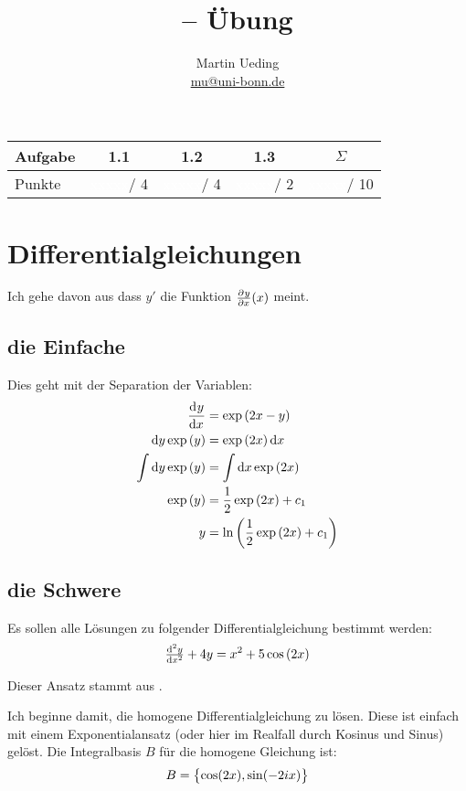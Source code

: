 \documentclass[11pt, ngerman]{article}
\title{\themodul{} -- Übung \theuebung \\ \vspace{0.5cm} \large{\thegruppe}}
\author{Martin Ueding \\ \small{\href{mailto:mu@uni-bonn.de}{mu@uni-bonn.de}}}
\newcommand{\punkte}{\textcolor{white}{xxxxx}}
\begin{document}
\maketitle

\begin{table}[h]
	\centering
	\begin{tabular}{l|c|c|c|c}
		Aufgabe & 1.1 & 1.2 & 1.3 & $\Sigma$   \\
		\hline
		Punkte & \punkte / 4 & \punkte / 4 & \punkte / 2 & \punkte / 10
	\end{tabular}
\end{table}

\section{Differentialgleichungen}

Ich gehe davon aus dass $y'$ die Funktion $\pd yx(x)$ meint.

\subsection{die Einfache}

Dies geht mit der Separation der Variablen:
%
\begin{align*}
	\dod yx &= \exp\del{2x-y} \\
	\dif y \exp\del y &= \exp\del{2x} \dif x \\
	\int \dif y \exp \del y &= \int \dif x \exp\del{2x} \\
	\exp\del y &= \frac 12 \exp\del{2x} + c_1 \\
			 y &= \ln\del{\frac 12 \exp\del{2x} + c_1}
\end{align*}


\subsection{die Schwere}

Es sollen alle Lösungen zu folgender Differentialgleichung bestimmt werden:
\[
	\od[2] yx + 4y = x^2 + 5 \cos\del{2x}
\]

Dieser Ansatz stammt aus \cite[Seite 181]{heuser-dgl}.

Ich beginne damit, die homogene Differentialgleichung zu lösen. Diese ist
einfach mit einem Exponentialansatz (oder hier im Realfall durch Kosinus und
Sinus) gelöst. Die Integralbasis $B$ für die homogene Gleichung ist:
\[
	B = \set{\cos(2x), \sin(-2ix)}
\]
\end{document}
